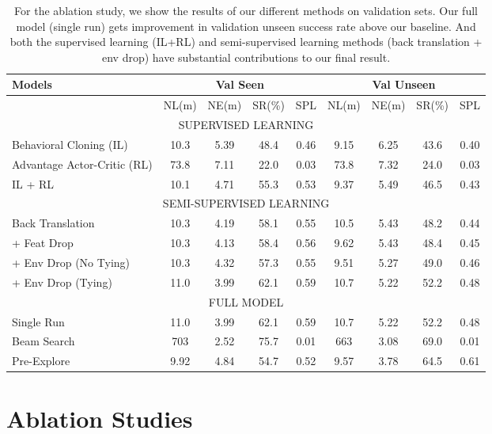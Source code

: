 \documentclass[11pt,a4paper]{article}
\begin{document}
\begin{table*}[t]
\small
\begin{center}

 \begin{tabular}{|l | c c c c | c c c c|}
  \hline
  Models & \multicolumn{4}{c|}{Val Seen} &  \multicolumn{4}{c|}{Val Unseen} \\
  \hline 
   & NL(m) & NE(m)  & SR(\%) & SPL &   NL(m) & NE(m)  & SR(\%) & SPL  \\
\hline\hline
\multicolumn{9}{|c|}{SUPERVISED LEARNING}\\
\hline\hline
Behavioral Cloning (IL) & 10.3&	5.39&	48.4&	0.46&	9.15&	6.25&	43.6&	0.40\\
Advantage Actor-Critic (RL) & 73.8&	7.11&	22.0&	0.03&	73.8&	7.32&	24.0&	0.03\\
IL + RL& 10.1&	4.71&	55.3&	0.53&	9.37&	5.49&	46.5&	0.43 \\
\hline\hline
\multicolumn{9}{|c|}{ SEMI-SUPERVISED LEARNING }\\
\hline\hline
Back Translation & 10.3&	4.19&	58.1&	0.55&	10.5&	5.43&	48.2&	0.44 \\
+ Feat Drop & 10.3&	4.13&	58.4&	0.56& 	9.62&	5.43&	48.4&	0.45\\
+ Env Drop (No Tying)  &10.3&	4.32&	57.3&	0.55&	9.51&	5.27&	49.0&	0.46 \\
+ Env Drop (Tying)&  11.0&	3.99&	62.1&	0.59&	10.7&	5.22&	52.2&	0.48 \\ 
\hline\hline
\multicolumn{9}{|c|}{ FULL MODEL }\\
  \hline\hline
 Single Run&  11.0&	3.99&	62.1&	0.59&	10.7&	5.22&	52.2&	0.48\\
  Beam Search  &703 &	2.52 &	75.7 &	0.01&	663&	3.08&	69.0&	0.01 \\
  Pre-Explore  & 9.92 &	4.84 & 54.7 &	0.52&	9.57&	3.78&	64.5&	0.61 \\
  \hline
\end{tabular}
\end{center}
\caption{For the ablation study, we show the results of our different methods on validation sets. 
Our full model (single run) gets  improvement in validation unseen success rate above our baseline. 
And both the supervised learning (IL+RL) and semi-supervised learning methods (back translation + env drop) have substantial contributions to our final result.
}
\vspace{-5pt}
\label{table:ablation}
\end{table*}


\section{Ablation Studies}
\label{sec:ablations}
\end{document}
